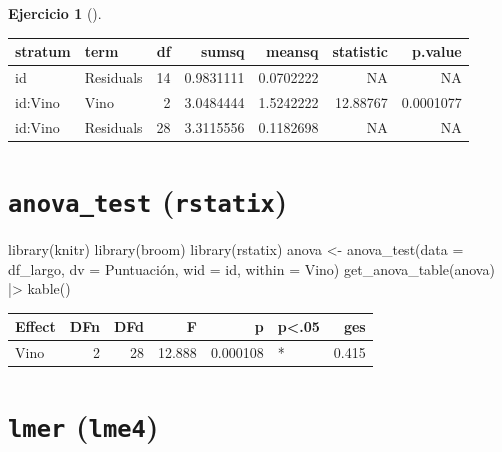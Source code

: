 \documentclass[
  a4paper,
]{scrreport}
\newenvironment{Shaded}{\begin{snugshade}}{\end{snugshade}}
\newcommand{\AttributeTok}[1]{\textcolor[rgb]{0.40,0.45,0.13}{#1}}
\newcommand{\FunctionTok}[1]{\textcolor[rgb]{0.28,0.35,0.67}{#1}}
\newcommand{\NormalTok}[1]{\textcolor[rgb]{0.00,0.23,0.31}{#1}}
\newcommand{\OtherTok}[1]{\textcolor[rgb]{0.00,0.23,0.31}{#1}}
\newcommand{\SpecialCharTok}[1]{\textcolor[rgb]{0.37,0.37,0.37}{#1}}
\theoremstyle{definition}
\newtheorem{exercise}{Ejercicio}[chapter]
\theoremstyle{remark}
\begin{document}
\begin{exercise}[]
\begin{enumerate}
\begin{tcolorbox}
  \begin{longtable}[]{@{}llrrrrr@{}}
  \toprule\noalign{}
  stratum & term & df & sumsq & meansq & statistic & p.value \\
  \midrule\noalign{}
  \endhead
  \bottomrule\noalign{}
  \endlastfoot
  id & Residuals & 14 & 0.9831111 & 0.0702222 & NA & NA \\
  id:Vino & Vino & 2 & 3.0484444 & 1.5242222 & 12.88767 & 0.0001077 \\
  id:Vino & Residuals & 28 & 3.3115556 & 0.1182698 & NA & NA \\
  \end{longtable}

  \section{\texorpdfstring{\texttt{anova\_test}
  (\texttt{rstatix})}{anova\_test (rstatix)}}

\begin{Shaded}
\begin{Highlighting}[]
\FunctionTok{library}\NormalTok{(knitr)}
\FunctionTok{library}\NormalTok{(broom)}
\FunctionTok{library}\NormalTok{(rstatix)}
\NormalTok{anova }\OtherTok{\textless{}{-}} \FunctionTok{anova\_test}\NormalTok{(}\AttributeTok{data =}\NormalTok{ df\_largo, }\AttributeTok{dv =}\NormalTok{ Puntuación, }\AttributeTok{wid =}\NormalTok{ id, }\AttributeTok{within =}\NormalTok{ Vino)}
\FunctionTok{get\_anova\_table}\NormalTok{(anova) }\SpecialCharTok{|\textgreater{}}
    \FunctionTok{kable}\NormalTok{()}
\end{Highlighting}
\end{Shaded}

  \begin{longtable}[]{@{}lrrrrlr@{}}
  \toprule\noalign{}
  Effect & DFn & DFd & F & p & p\textless.05 & ges \\
  \midrule\noalign{}
  \endhead
  \bottomrule\noalign{}
  \endlastfoot
  Vino & 2 & 28 & 12.888 & 0.000108 & * & 0.415 \\
  \end{longtable}

  \section{\texorpdfstring{\texttt{lmer} (\texttt{lme4})}{lmer (lme4)}}


\end{tcolorbox}
\end{enumerate}
\end{exercise}
\end{document}
